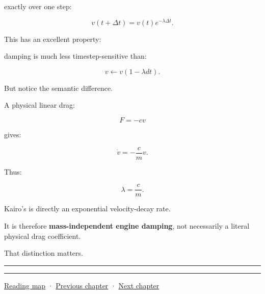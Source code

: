 exactly over one step:

\[
\boxed{
v(t+\Delta t)
=
v(t)e^{-\lambda\Delta t}.
}
\]

This has an excellent property:

damping is much less timestep-sensitive than:

\[
v\leftarrow v(1-\lambda dt).
\]

But notice the semantic difference.

A physical linear drag:

\[
F=-cv
\]

gives:

\[
\dot v
=
-\frac{c}{m}v.
\]

Thus:

\[
\lambda
=
\frac{c}{m}.
\]

Kairo's  is directly an exponential velocity-decay rate.

It is therefore \textbf{mass-independent engine damping}, not necessarily a literal physical drag coefficient.

That distinction matters.

\begin{center}\rule{0.5\linewidth}{0.5pt}\end{center}

\begin{center}\rule{0.5\linewidth}{0.5pt}\end{center}

\hyperref[volume-reading-map]{Reading map} · \hyperref[06-engine-ii-ch033-versioned-scenes-and-transactional-loading]{Previous chapter} · \hyperref[06-engine-ii-ch035-a-complete-rigid-body-state-before-the-formula-audit]{Next chapter}
